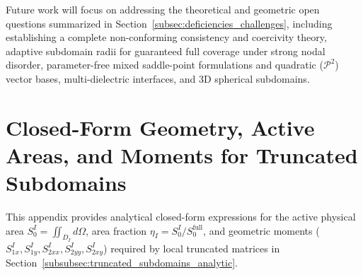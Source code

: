 \documentclass[VANCOUVER,Times1COL]{WileyNJD-v5}
\begin{document}
Future work will focus on addressing the theoretical and geometric open questions summarized in Section~\ref{subsec:deficiencies_challenges}, including establishing a complete non-conforming consistency and coercivity theory, adaptive subdomain radii for guaranteed full coverage under strong nodal disorder, parameter-free mixed saddle-point formulations and quadratic ($\mathcal{P}^2$) vector bases, multi-dielectric interfaces, and 3D spherical subdomains.

\appendix
\section{Closed-Form Geometry, Active Areas, and Moments for Truncated Subdomains}
\label{app:truncated_geometry}

This appendix provides analytical closed-form expressions for the active physical area $S_0^I = \iint_{D_I} d\Omega$, area fraction $\eta_I = S_0^I / S_0^{\mathrm{full}}$, and geometric moments ($S_{1x}^I, S_{1y}^I, S_{2xx}^I, S_{2yy}^I, S_{2xy}^I$) required by local truncated matrices in Section~\ref{subsubsec:truncated_subdomains_analytic}.
\end{document}
